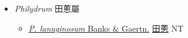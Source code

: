 
  \begin{itemize}
 \item[] \textit{Philydrum} 田蔥屬
                    
  \begin{itemize}
        \item[] \href{http://www.theplantlist.org/tpl1.1/search?q=Philydrum+lanuginosum}{\textit{P. lanuginosum} Banks \& Gaertn.}   \href{\detokenize{http://taibnet.sinica.edu.tw/chi/taibnet_species_list.php?T2=田蔥&T2_new_value=true&fr=y}}{田蔥} NT
  \end{itemize}
  \end{itemize}
